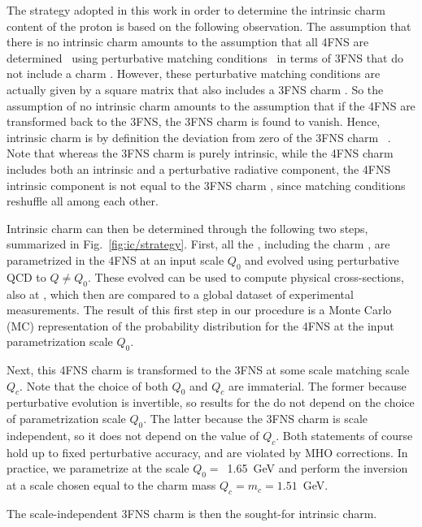 
The strategy adopted in this work in order to
determine the intrinsic charm content of the proton is 
based on the following
observation.
%
The assumption that there is no intrinsic charm
amounts to the assumption
that all 4FNS \pdfs are determined~\cite{Collins:1986mp} using
perturbative matching conditions~\cite{pdfnnlo} in terms of 
3FNS \pdfs
that do not include
a charm \pdf.
%
However, these perturbative matching conditions are
actually given by a square matrix that also includes a 3FNS charm
\pdf.
%
So the assumption of no intrinsic charm amounts to the assumption
that if the 4FNS \pdfs are transformed back to the 3FNS, the 3FNS charm
\pdf is found to vanish. Hence, intrinsic charm is by definition the
deviation from zero of the 3FNS charm \pdf~\cite{Ball:2015dpa}. Note
that whereas the 3FNS charm \pdf is purely intrinsic, while the 4FNS
charm \pdf includes both an intrinsic and a perturbative
 radiative component, the
4FNS intrinsic component is not equal to the 3FNS charm \pdf, since
matching conditions reshuffle all \pdfs among each other. 

Intrinsic charm can then be determined through the following two steps,
summarized in Fig.~\ref{fig:ic/strategy}. 
First, all the \pdfs, including the charm \pdf, are parametrized 
in the 4FNS at an input scale $Q_0$ and evolved 
using \nnlo perturbative QCD to   $Q \not = Q_0$.
%
These evolved \pdfs can be used to 
compute physical cross-sections, also at \nnlo, which then are
compared to a global dataset of experimental measurements.
%
The result of this first step in our procedure is 
a Monte Carlo (MC) representation
of the probability distribution for the 4FNS \pdfs at the input
parametrization scale $Q_0$.

Next, this 4FNS charm \pdf is transformed to the 3FNS at some scale matching scale
$Q_c$.
%
Note that the choice of both $Q_0$ and $Q_c$ are immaterial. The former
because perturbative evolution is invertible, so
results for the \pdfs do not depend on the choice of
parametrization scale $Q_0$. The latter because 
the 3FNS charm is scale independent, so it does not depend on the
value of $Q_c$.
Both statements of course hold up to fixed perturbative accuracy, and
are violated by MHO corrections.
%
In practice, we parametrize \pdfs at the scale
$Q_0=$~1.65~GeV and perform the inversion at a scale
chosen equal to the charm mass $Q_c=m_c=1.51$~GeV.

The scale-independent 3FNS charm \pdf is then the sought-for intrinsic
charm.

